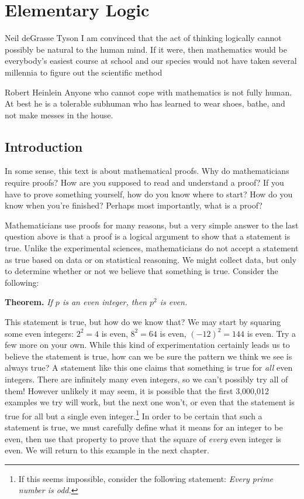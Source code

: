 \chapter{Elementary Logic}

\begin{chapqt}{Neil deGrasse Tyson}
I am convinced that the act of thinking logically cannot possibly be natural to the human mind. If it were, then mathematics would be everybody's easiest course at school and our species would not have taken several millennia to figure out the scientific method
\end{chapqt}

\begin{chapqt}{Robert Heinlein}
Anyone who cannot cope with mathematics is not fully human. At best he is a tolerable subhuman who has learned to wear shoes, bathe, and not make messes in the house.
\end{chapqt}

\section*{Introduction}

In some sense, this text is about mathematical proofs. Why do mathematicians require proofs? How are you supposed to read and understand a proof?  If you have to prove something yourself, how do you know where to start?  How do you know when you're finished? Perhaps most importantly, what is a proof?

Mathematicians use proofs for many reasons, but a very simple answer to the last question above is that a proof is a logical argument to show that a statement is true.  Unlike the experimental sciences, mathematicians do not accept a statement as true based on data or on statistical reasoning.  We might collect data, but only to determine whether or not we believe that something is true.  Consider the following:

\medbreak\noindent
{\bf Theorem.} \emph{If $p$ is an even integer, then $p^2$ is even.}
\medbreak

This statement is true, but how do we know that?  We may start by squaring some even integers: $2^2=4$ is even, $8^2=64$ is even, $(-12)^2=144$ is even. Try a few more on your own. While this kind of experimentation certainly leads us to believe the statement is true, how can we be sure the pattern we think we see is always true? A statement like this one claims that something is true for \emph{all} even integers. There are infinitely many even integers, so we can't possibly try all of them! However unlikely it may seem, it is possible that the first 3,000,012 examples we try will work, but the next one won't, or even that the statement is true for all but a single even integer.\footnote{If this seems impossible, consider the following statement: \emph{Every prime number is odd.}} In order to be certain that such a statement is true, we must carefully define what it means for an integer to be even, then use that property to prove that the square of \emph{every} even integer is even. We will return to this example in the next chapter.

